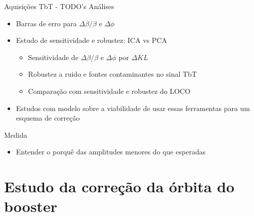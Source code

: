 \documentclass[aspectratio=169]{beamer}            %
\begin{document}
\begin{frame}{Aquisições TbT - TODO's}
Análises
    \begin{itemize}
        \setlength\itemsep{1em}
        \item Barras de erro para $\Delta \beta/\beta$ e $\Delta \phi$
        \item Estudo de sensitividade e robustez: ICA vs PCA 
        \begin{itemize}
            \item Sensitividade de $\Delta \beta / \beta$ e $\Delta \phi$ por $\Delta KL$
            \item Robustez a ruido e fontes contaminantes no sinal TbT
            \item Comparação com sensitividade e robustez do LOCO
        \end{itemize}
        \item Estudos com modelo sobre a viabilidade de usar essas ferramentas para um esquema de correção
    \end{itemize}
\vfill
Medida
    \begin{itemize}
        \setlength\itemsep{1em}
        \item Entender o porquê das amplitudes menores do que esperadas 
    \end{itemize}
\end{frame}



\section{Estudo da correção da órbita do booster}
\end{document}

